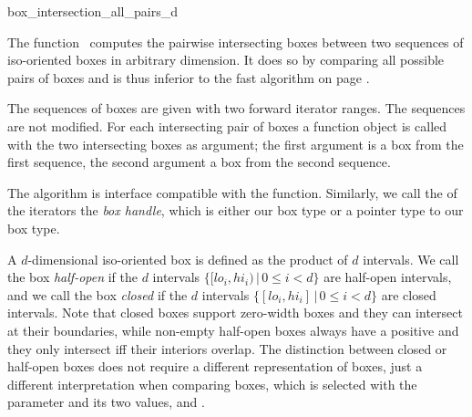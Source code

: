 

\begin{ccRefFunction}{box_intersection_all_pairs_d}

\ccDefinition
  
The function \ccRefName\ computes the pairwise intersecting boxes
between two sequences of iso-oriented boxes in arbitrary dimension.
It does so by comparing all possible pairs of boxes and is thus
inferior to the fast  algorithm on page
\pageref{ccRef_CGAL::box_intersection_d}.

The sequences of boxes are given with two forward iterator ranges. The
sequences are not modified. For each intersecting pair of boxes a
 function object is called with the two intersecting
boxes as argument; the first argument is a box from the first
sequence, the second argument a box from the second sequence.

The algorithm is interface compatible with the
 function. Similarly, we call the
 of the iterators the \emph{box handle}, which is
either our box type or a pointer type to our box type.

A $d$-dimensional iso-oriented box is defined as the
 product of $d$ intervals. We call the
box \emph{half-open} if the $d$ intervals $\{ [lo_i,hi_i) \,|\, 0 \leq
i < d\}$ are half-open intervals, and we call the box \emph{closed} if
the $d$ intervals $\{ [lo_i,hi_i] \,|\, 0 \leq i < d\}$ are closed
intervals. Note that closed boxes support zero-width boxes and they
can intersect at their boundaries, while non-empty half-open boxes
always have a positive  and they only intersect iff their
interiors overlap.  The distinction between closed or half-open boxes
does not require a different representation of boxes, just a different
interpretation when comparing boxes, which is selected with the
 parameter and its two values,
 and
.


\end{ccRefFunction}
